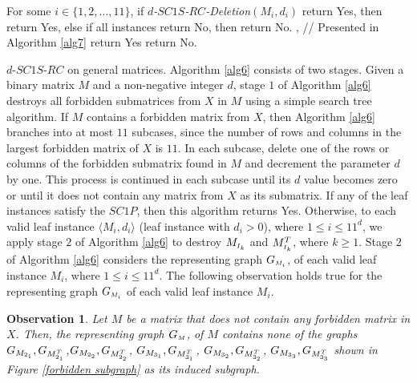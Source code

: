 \documentclass[review, 1p]{elsarticle}
\newtheorem{Observation}{Observation}
\begin{document}
\begin{algorithm}[h]
\begin{algorithmic}[1]
\noindent For some $i \in \{1,2,\ldots,11\}$, if \textit{$d$-$SC1S$-$RC$-Deletion}$(M_{i},d_{i})$ return Yes, then return Yes, else if all instances return No, then return No.  
\Else \vspace{-0.08 in}
,  \hspace{0.2 in}// Presented in Algorithm \ref{alg7} \vspace{-0.08 in}
\State return Yes \vspace{-0.08 in}
\Else \vspace{-0.08 in}
\State return No. \vspace{-0.08 in}
\EndIf \vspace{-0.08 in}
\EndIf
\end{algorithmic}
\end{algorithm} $d$-$SC1S$-$RC$ on general matrices. Algorithm \ref{alg6} consists of two stages. Given a binary matrix $M$ and a non-negative integer $d$, stage $1$ of Algorithm \ref{alg6} destroys all forbidden submatrices from $X$ in $M$ using a simple search tree  algorithm. If $M$ contains a forbidden matrix from $X$, then Algorithm \ref{alg6} branches into at most $11$ subcases, since the number of rows and columns in the largest forbidden matrix of $X$ is $11$. In each subcase, delete one of the rows or columns of the forbidden submatrix found in $M$ and decrement the parameter $d$ by one. This process is continued in each subcase until its $d$ value becomes zero or until it does not contain any matrix from $X$ as its submatrix. If any of the leaf instances satisfy the $SC1P$, then this algorithm returns Yes. Otherwise, to each valid leaf instance $ \langle M_{i},d_{i} \rangle$ (leaf instance with $d_{i}>0$), where $1 \leq i \leq 11^{d}$, we apply stage $2$ of Algorithm \ref{alg6} to destroy $M_{\mathsmaller I_{k}}$ and $M^{T}_{\mathsmaller{I_{k}}}$, where $k \geq 1$. Stage $2$ of Algorithm \ref{alg6} considers the representing graph $G_{\mathsmaller M_{i}}$, of each valid leaf instance $M_{i}$, where $1 \leq i \leq 11^{d}$. The following observation holds true for the representing graph $G_{\mathsmaller M_{i}}$ of each valid leaf instance $M_{i}$.
\begin{Observation}\label{obsr}
Let $M$ be a matrix that does not contain any forbidden matrix in $X$. Then, the representing graph $G_{\mathsmaller M}$, of $M$ contains none of the graphs $G_{ \tiny M_{2_{1}}}, G_{ \tiny M_{2_{1}}^{\tiny T}}$,$G_{ \tiny M_{2_{2}}},G_{ \tiny M_{2_{2}}^{\tiny T}}$, $G_{ \tiny M_{3_{1}}},G_{ \tiny M_{3_{1}}^{\tiny T}}$, $G_{ \tiny M_{3_{2}}},G_{ \tiny M_{3_{2}}^{\tiny T}}$, $G_{ \tiny M_{3_{3}}},G_{ \tiny M_{3_{3}}^{\tiny T}}$ shown in Figure \ref{forbidden subgraph} as its induced subgraph.\end{Observation}
\end{document}
